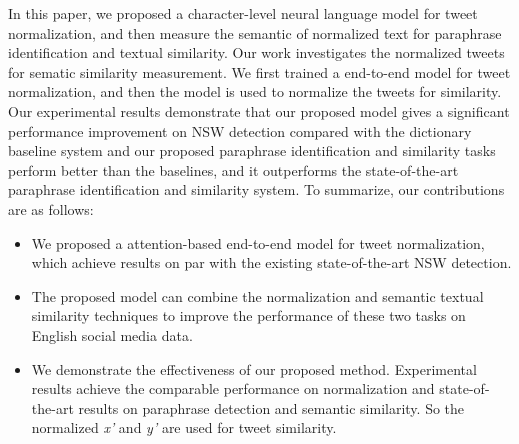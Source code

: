 \documentclass[letterpaper]{article}
\begin{document}
In this paper, we proposed a character-level neural language model for tweet normalization, and then measure the semantic of normalized text for paraphrase identification and textual similarity. Our work investigates the normalized tweets for sematic similarity measurement. We first trained a end-to-end model for tweet normalization, and then the model is used to normalize the tweets for similarity. Our experimental results demonstrate that our proposed model gives a significant performance improvement on NSW detection compared with the dictionary baseline system and our proposed paraphrase identification and similarity tasks perform better than the baselines, and it outperforms the state-of-the-art paraphrase identification and similarity system. To summarize, our contributions are as follows:

\begin{itemize}
	\item We proposed a attention-based end-to-end model for tweet normalization, which achieve results on par with the existing state-of-the-art NSW detection.
	\item The proposed model can combine the normalization and semantic textual similarity techniques to improve the performance of these two tasks on English social media data.
	\item We demonstrate the effectiveness of our proposed method. Experimental results achieve the comparable performance on normalization and state-of-the-art results on paraphrase detection and semantic similarity. So the normalized \textit{x'} and \textit{y'} are used for tweet similarity.
\end{itemize}
\end{document}
